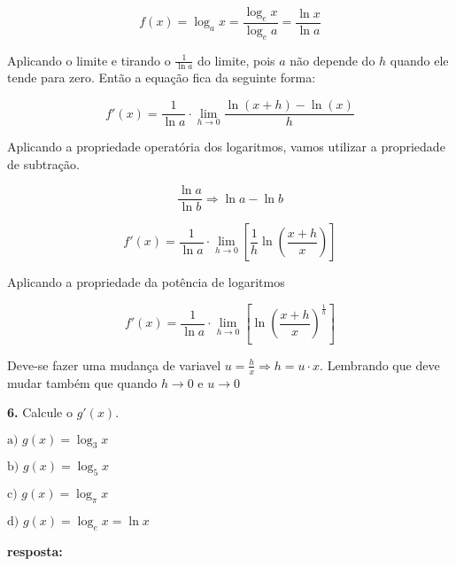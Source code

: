 \documentclass[article,12pt,oneside,a4paper,brazil]{abntex2}
\begin{document}
\begin{flushleft}
		\begin{equation*}
			f(x) = \log_{a}{x} = \frac{\log_{e}{x}}{\log_{e}{a}} = \frac{\ln{x}}{\ln{a}}
		\end{equation*}
		
		Aplicando o limite e tirando o $\frac{1}{\ln{a}}$ do limite, pois $a$ não depende do $h$ quando ele tende para zero. Então a equação fica da seguinte forma:
		
		\begin{equation*}
			f'(x) = \frac{1}{\ln{a}} \cdot \lim_{h \rightarrow 0} \frac{\ln{(x + h)} - \ln{(x)}}{h}
		\end{equation*}
		
		Aplicando a propriedade operatória dos logaritmos, vamos utilizar a propriedade de subtração.
		
		\begin{equation*}
			\frac{\ln{a}}{\ln{b}} \Rightarrow \ln{a} - \ln{b}
		\end{equation*}
		
		\begin{equation*}
			f'(x) = \frac{1}{\ln{a}} \cdot \lim_{h \rightarrow 0} \left[ \frac{1}{h} \ln \left( {\frac{x +h}{x}}\right) \right]
		\end{equation*}
		
		Aplicando a propriedade da potência de logaritmos
		
		\begin{equation*}
			f'(x) = \frac{1}{\ln{a}} \cdot \lim_{h \rightarrow 0} \left[ \ln \left( {\frac{x +h}{x}}\right)^{\frac{1}{h}} \right]
		\end{equation*}
		
		Deve-se fazer uma mudança de variavel $u=\frac{h}{x} \Rightarrow h =u \cdot x$. Lembrando que deve mudar também que quando $h \rightarrow 0$ e $u \rightarrow 0$
		
		\vspace{1em}
		
		\textbf{6.} Calcule o $g'(x)$.
		
		\begin{adjustwidth}{0.5cm}{0cm}
			$\text{a) } g(x) = \log_{3}{x}$
			
			$\text{b) } g(x) = \log_{5}{x}$
			
			$\text{c) } g(x) = \log_{\pi}{x}$
			
			$\text{d) } g(x) = \log_{e}{x} = \ln{x}$
		\end{adjustwidth}	
		
		\textbf{resposta:}
		
		
		\vspace{1em}
	\end{flushleft}
	

	
	
\end{document}
